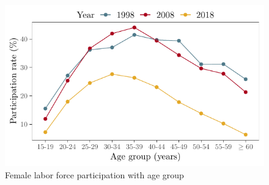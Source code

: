 \begin{figure}[h] 
	\centering
	\includegraphics{./figure/AgeWise_femalParticipation_NLFS_all}
	\caption{Female labor force participation with age group}
	\label{fig:ageWiseFemaleParticipation}
\end{figure}  

